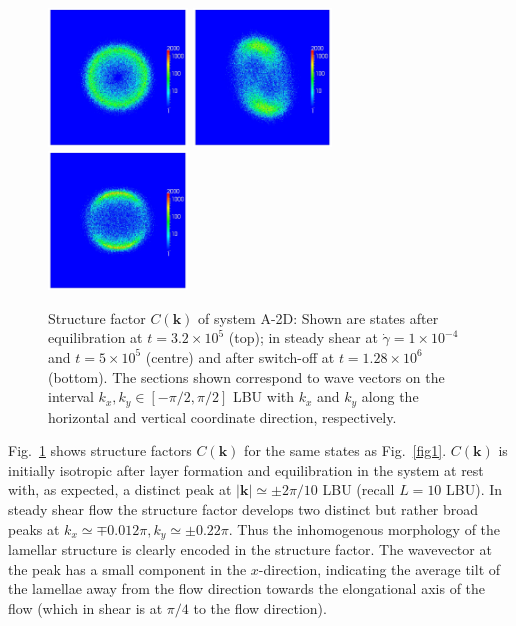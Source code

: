 \documentclass[8.5pt,twoside,twocolumn]{article}
\newcommand{\e}[1]{\times10^{#1}}
\begin{document}
\begin{figure}[htp]
\centering
\includegraphics[angle=0,width=0.33\textwidth]{ck_run703_320.jpg}
\includegraphics[angle=0,width=0.33\textwidth]{ck_run704_500.jpg}
\includegraphics[angle=0,width=0.33\textwidth]{ck_run705_1280.jpg}
\caption{Structure factor $C({\bm k})$ of system A-2D: Shown are states after equilibration at $t=3.2\e{5}$ (top); in steady shear at $\dot{\gamma}=1\times10^{-4}$ and $t=5\e{5}$ (centre) and after switch-off at $t=1.28\e{6}$ (bottom). The sections shown correspond to wave vectors on the interval $k_x, k_y \in [-\pi/2,\pi/2 ]$ LBU with $k_x$ and $k_y$ along the horizontal and vertical coordinate direction, respectively.}
\label{fig5}
\end{figure}

Fig.~\ref{fig5} shows structure factors $C({\bm k})$ for the same states as Fig.~\ref{fig1}.
$C({\bm k})$ is initially isotropic after layer formation and equilibration in the system at rest with, as expected, a distinct peak at $|{\bm k}|\simeq \pm2\pi/10$ LBU (recall $L = 10$ LBU).
In steady shear flow the structure factor develops two distinct but rather broad peaks at $k_x\simeq\mp 0.012\pi, k_y\simeq\pm 0.22 \pi$.
Thus the inhomogenous morphology of the lamellar structure is clearly encoded in the structure factor. 
The wavevector at the peak has a small component in the $x$-direction, indicating the average tilt of the lamellae away from the flow direction towards the elongational axis of the flow (which in shear is at $\pi/4$ to the flow direction). 
\end{document}

